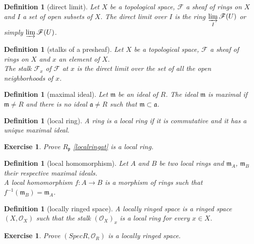 \documentclass[12pt]{article}
\newtheorem{definition}[proposition]{Definition}
\newtheorem{ex}[proposition]{Exercise}
\begin{document}
\begin{definition}[direct limit]
	Let $X$ be a topological space, $\mathscr{F}$ a sheaf of rings on $X$ and $I$ a set of open subsets of $X$. The direct limit over $I$ is the ring $\displaystyle \varinjlim_I \mathscr{F}(U)$ or simply $\varinjlim \mathscr{F}(U)$.
\end{definition}

\begin{definition}[stalks of a presheaf]
	Let $X$ be a topological space, $\mathscr{F}$ a sheaf of rings on $X$ and $x$ an element of $X$. \\
	The stalk $\mathscr{F}_x$ of $\mathscr{F}$ at $x$ is the direct limit over the set of all the open neighborhoods of $x$.   
\end{definition}

\begin{definition}[maximal ideal]
	Let $\mathfrak{m}$ be an ideal of $R$. The ideal $\mathfrak{m}$ is maximal if $\mathfrak{m} \neq R$ and there is no ideal $\mathfrak{a} \neq R$ such that $\mathfrak{m} \subset \mathfrak{a}$.
\end{definition}

\begin{definition}[local ring]
	A ring is a local ring if it is commutative and it has a unique maximal ideal. 	
\end{definition}

\begin{ex}
	Prove $R_{\mathfrak{p}}$ \ref{localringat} is a local ring.
\end{ex}

\begin{definition}[local homomorphism]
	Let $A$ and $B$ be two local rings and $\mathfrak{m}_A$, $\mathfrak{m}_B$ their respective maximal ideals. \\
	A local homomorphism $f: A \rightarrow B$ is a morphism of rings such that $f^{-1} (\mathfrak{m}_B) = \mathfrak{m}_A$. 
\end{definition}		

\begin{definition}[locally ringed space]
	A locally ringed space is a ringed space $(X, \mathscr{O}_X)$ such that the stalk $(\mathscr{O}_X)_x$ is a local ring for every $x \in X$.
\end{definition}

\begin{ex}
	Prove $(Spec R, \mathscr{O}_R)$ is a locally ringed space.
\end{ex}
\end{document}
